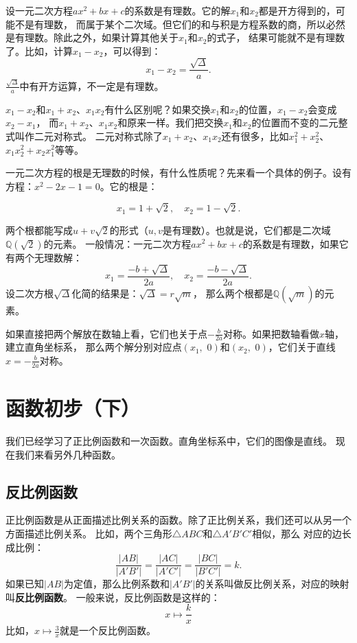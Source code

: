 \documentclass[12pt,UTF8]{ctexbook}
\begin{document}
设一元二次方程$ax^2 + bx + c$的系数是有理数。它的解$x_1$和$x_2$都是开方得到的，可能不是有理数，
而属于某个二次域。但它们的和与积是方程系数的商，所以必然是有理数。除此之外，如果计算其他关于$x_1$和$x_2$的式子，
结果可能就不是有理数了。比如，计算$x_1 - x_2$，可以得到：
$$ x_1 - x_2 = \frac{\sqrt{\Delta}}{a}. $$
$\frac{\sqrt{\Delta}}{a}$中有开方运算，不一定是有理数。

$x_1 - x_2$和$x_1 + x_2$、$x_1x_2$有什么区别呢？如果交换$x_1$和$x_2$的位置，$x_1 - x_2$会变成$x_2 - x_1$，
而$x_1 + x_2$、$x_1x_2$和原来一样。我们把交换$x_1$和$x_2$的位置而不变的二元整式叫作二元对称式。
二元对称式除了$x_1 + x_2$、$x_1x_2$还有很多，比如$x_1^2 + x_2^2$、$x_1x_2^2 + x_2x_1^2$等等。

一元二次方程的根是无理数的时候，有什么性质呢？先来看一个具体的例子。设有方程：$x^2 - 2x - 1 = 0$。它的根是：

$$ x_1 = 1 + \sqrt{2}, \quad x_2 = 1 - \sqrt{2}.$$

两个根都能写成$u + v\sqrt{2}$的形式（$u,v$是有理数）。也就是说，它们都是二次域$\mathbb{Q}(\sqrt{2})$的元素。
一般情况：一元二次方程$ax^2 + bx + c$的系数是有理数，如果它有两个无理数解：
$$x_{1} = \frac{-b + \sqrt{\Delta}}{2a},\quad x_{2} = \frac{-b - \sqrt{\Delta}}{2a}.$$
设二次方根$\sqrt{\Delta}$化简的结果是：$\sqrt{\Delta} = r\sqrt{m}$，
那么两个根都是$\mathbb{Q}(\sqrt{m})$的元素。

如果直接把两个解放在数轴上看，它们也关于点$-\frac{b}{2a}$对称。如果把数轴看做$x$轴，建立直角坐标系，
那么两个解分别对应点$(x_1, \,\,0)$和$(x_2, \,\,0)$，它们关于直线$x = -\frac{b}{2a}$对称。

\chapter{函数初步（下）}
我们已经学习了正比例函数和一次函数。直角坐标系中，它们的图像是直线。
现在我们来看另外几种函数。

\section{反比例函数}
正比例函数是从正面描述比例关系的函数。除了正比例关系，我们还可以从另一个方面描述比例关系。
比如，两个三角形$\triangle ABC$和$\triangle A'B'C'$相似，那么
对应的边长成比例：
$$ \frac{|AB|}{|A'B'|} = \frac{|AC|}{|A'C'|} = \frac{|BC|}{|B'C'|} = k.$$
如果已知$|AB|$为定值，那么比例系数和$|A'B'|$的关系叫做反比例关系，对应的映射叫\textbf{反比例函数}。
一般来说，反比例函数是这样的：
$$ x \mapsto \frac{k}{x}$$
比如，$x \mapsto \frac{3}{x}$就是一个反比例函数。
\end{document}
